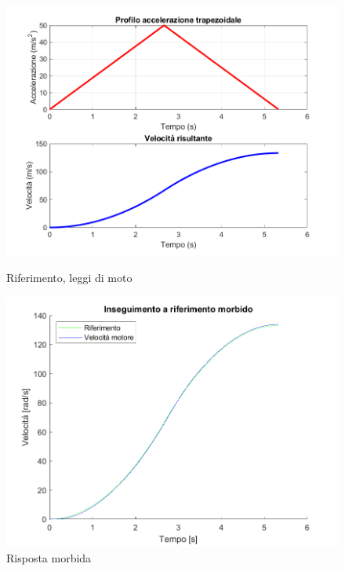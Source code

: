 \documentclass[a4paper,12pt]{article}
\begin{document}
\begin{figure}[h!]
    \centering
    \begin{minipage}{0.48\textwidth}
        \centering
        \includegraphics[scale = 0.5]{Immagini/PlotMatlab/leggiMotoDaFermo.png}
        \caption{Riferimento, leggi di moto}
        \label{fig: leggiDIMoto}
    \end{minipage}\hfill
    \begin{minipage}{0.48\textwidth}
        \centering
        \includegraphics[scale = 0.5]{Immagini/PlotMatlab/rispostaLeggiMoto.png}
        \caption{Risposta morbida}
        \label{fig: rispostaMorbida}
    \end{minipage}
\end{figure}
\end{document}
